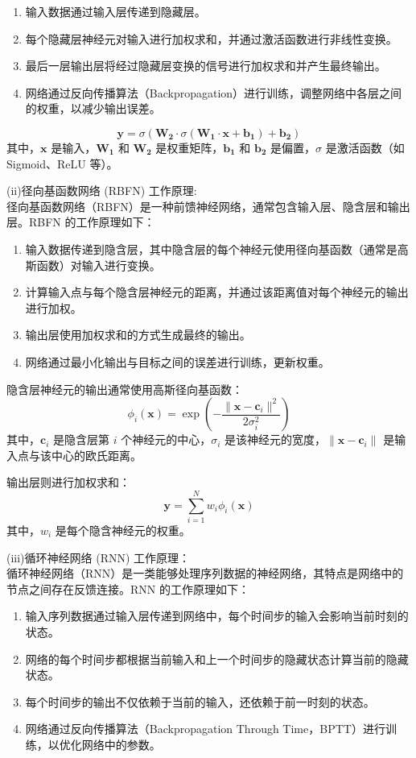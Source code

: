 \documentclass{article}
\begin{document}
\begin{enumerate}
    \item 输入数据通过输入层传递到隐藏层。
    \item 每个隐藏层神经元对输入进行加权求和，并通过激活函数进行非线性变换。
    \item 最后一层输出层将经过隐藏层变换的信号进行加权求和并产生最终输出。
    \item 网络通过反向传播算法（Backpropagation）进行训练，调整网络中各层之间的权重，以减少输出误差。
\end{enumerate}
\[
\mathbf{y} = \sigma(\mathbf{W_2} \cdot \sigma(\mathbf{W_1} \cdot \mathbf{x} + \mathbf{b_1}) + \mathbf{b_2})
\]
其中，$\mathbf{x}$ 是输入，$\mathbf{W_1}$ 和 $\mathbf{W_2}$ 是权重矩阵，$\mathbf{b_1}$ 和 $\mathbf{b_2}$ 是偏置，$\sigma$ 是激活函数（如 Sigmoid、ReLU 等）。

(ii)径向基函数网络 (RBFN) 工作原理:\\
径向基函数网络（RBFN）是一种前馈神经网络，通常包含输入层、隐含层和输出层。RBFN 的工作原理如下：

\begin{enumerate}
    \item 输入数据传递到隐含层，其中隐含层的每个神经元使用径向基函数（通常是高斯函数）对输入进行变换。
    \item 计算输入点与每个隐含层神经元的距离，并通过该距离值对每个神经元的输出进行加权。
    \item 输出层使用加权求和的方式生成最终的输出。
    \item 网络通过最小化输出与目标之间的误差进行训练，更新权重。
\end{enumerate}

隐含层神经元的输出通常使用高斯径向基函数：
\[
\phi_i(\mathbf{x}) = \exp \left( -\frac{\|\mathbf{x} - \mathbf{c}_i\|^2}{2 \sigma_i^2} \right)
\]
其中，$\mathbf{c}_i$ 是隐含层第 $i$ 个神经元的中心，$\sigma_i$ 是该神经元的宽度，$\|\mathbf{x} - \mathbf{c}_i\|$ 是输入点与该中心的欧氏距离。

输出层则进行加权求和：
\[
\mathbf{y} = \sum_{i=1}^{N} w_i \phi_i(\mathbf{x})
\]
其中，$w_i$ 是每个隐含神经元的权重。

(iii)循环神经网络 (RNN) 工作原理：\\
循环神经网络（RNN）是一类能够处理序列数据的神经网络，其特点是网络中的节点之间存在反馈连接。RNN 的工作原理如下：

\begin{enumerate}
    \item 输入序列数据通过输入层传递到网络中，每个时间步的输入会影响当前时刻的状态。
    \item 网络的每个时间步都根据当前输入和上一个时间步的隐藏状态计算当前的隐藏状态。
    \item 每个时间步的输出不仅依赖于当前的输入，还依赖于前一时刻的状态。
    \item 网络通过反向传播算法（Backpropagation Through Time，BPTT）进行训练，以优化网络中的参数。
\end{enumerate}
\end{document}
